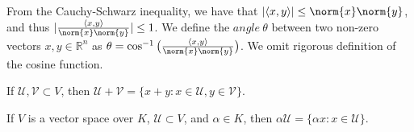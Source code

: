 \documentclass[crop=false,class=article,oneside]{standalone}
\begin{document}
            \begin{remark}
            From the Cauchy-Schwarz inequality, we have that $|\langle x,y \rangle| \leq \norm{x}\norm{y}$, and thus $|\frac{\langle x,y \rangle}{\norm{x}\norm{y}}| \leq 1$. We define the $angle\ \theta$ between two non-zero vectors $x,y\in \mathbb{R}^n$ as $\theta=\cos^{-1}\big(\frac{\langle x,y \rangle}{\norm{x}\norm{y}}\big)$. We omit rigorous definition of the cosine function.
            \end{remark}
            \begin{definition}
            If $\mathcal{U},\mathcal{V}\subset V$, then $\mathcal{U}+\mathcal{V} = \{x+y:x\in \mathcal{U},y\in \mathcal{V}\}$.
            \end{definition}
            \begin{definition}
            If $V$ is a vector space over $K$, $\mathcal{U}\subset V$, and $\alpha \in K$, then $\alpha \mathcal{U} = \{\alpha x:x\in \mathcal{U}\}$.
            \end{definition}
\end{document}
